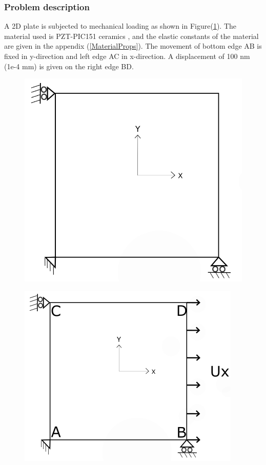 \documentclass[11pt]{article}
\begin{document}
\subsubsection{Problem description} \label{2DPWLELPD}
A 2D plate is subjected to mechanical loading as shown in Figure(\ref{XYLoading}). The material used is PZT-PIC151 ceramics \cite{kozinov2018simulation}, and the elastic constants of the material are given in the appendix (\ref{MaterialProps}).
The movement of bottom edge AB is fixed in y-direction and left edge AC in x-direction. A displacement of 100 nm (1e-4 mm) is given on the right edge BD.
\begin{figure}[H]
	\centering
	\begin{minipage}{.5\textwidth}
		\centering
		\includegraphics[width=0.8\linewidth]{2DPlate.png}
		\label{2Dplate}
	\end{minipage}%
	\begin{minipage}{.5\textwidth}
		\centering
		\includegraphics[width=0.9\linewidth]{XYLoading.png}
		\label{XYLoading}
	\end{minipage}
\end{figure}
\end{document}
